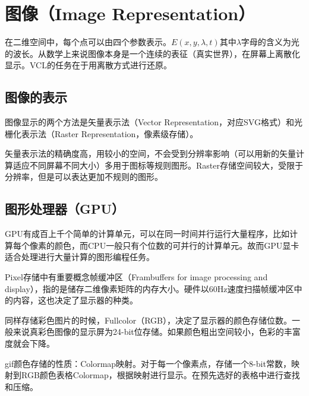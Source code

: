 \section{图像（Image Representation）}

在二维空间中，每个点可以由四个参数表示。$E(x,y,\lambda,t)$其中$\lambda$字母的含义为光的波长。从数学上来说图像本身是一个连续的表征（真实世界），在屏幕上离散化显示。VCL的任务在于用离散方式进行还原。

\subsection{图像的表示}

图像显示的两个方法是矢量表示法（Vector Representation，对应SVG格式）和光栅化表示法（Raster Representation，像素级存储）。

矢量表示法的精确度高，用较小的空间，不会受到分辨率影响（可以用新的矢量计算适应不同屏幕不同大小）多用于图标等规则图形。Raster存储空间较大，受限于分辨率，但是可以表达更加不规则的图形。

\subsection{图形处理器（GPU）}

GPU有成百上千个简单的计算单元，可以在同一时间并行运行大量程序，比如计算每个像素的颜色，而CPU一般只有个位数的可并行的计算单元。故而GPU显卡适合处理进行大量计算的图形编程任务。

Pixel存储中有重要概念帧缓冲区（Frambuffers for image processing and display），指的是储存二维像素矩阵的内存大小。硬件以60Hz速度扫描帧缓冲区中的内容，这也决定了显示器的种类。

同样存储彩色图片的时候，Fullcolor（RGB），决定了显示器的颜色存储位数。一般来说真彩色图像的显示屏为24-bit位存储。如果颜色粗出空间较小，色彩的丰富度就会下降。

gif颜色存储的性质：Colormap映射。对于每一个像素点，存储一个8-bit常数，映射到RGB颜色表格Colormap，根据映射进行显示。在预先选好的表格中进行查找和压缩。

